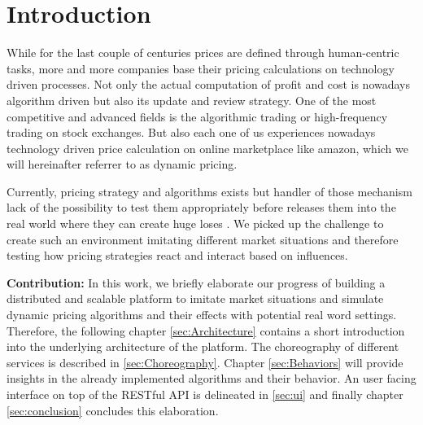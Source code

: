 \section{Introduction}
%
While for the last couple of centuries prices are defined through human-centric tasks, more and more companies base their pricing calculations on technology driven processes. Not only the actual computation of profit and cost is nowadays algorithm driven but also its update and review strategy.
One of the most competitive and advanced fields is the algorithmic trading or high-frequency trading on stock exchanges. But also each one of us experiences nowadays technology driven price calculation on online marketplace like amazon, which we will hereinafter referrer to as dynamic pricing. 

Currently, pricing strategy and algorithms exists but handler of those mechanism lack of the possibility to test them appropriately before releases them into the real world where they can create huge loses \citep{uflacker2016ertragsmanagement} \citep{schlosser2016optimal} \citep{schlosser2016stochastic} \citep{schlosser2016survive}. We picked up the challenge to create such an environment imitating different market situations and therefore testing how pricing strategies react and interact based on influences.

\textbf{Contribution:} In this work, we briefly elaborate our progress of building a distributed and scalable platform to imitate market situations and simulate dynamic pricing algorithms and their effects with potential real word settings.
Therefore, the following chapter \ref{sec:Architecture} contains a short introduction into the underlying architecture of the platform.
The choreography of different services is described in \ref{sec:Choreography}. Chapter \ref{sec:Behaviors} will provide insights in the already implemented algorithms and their behavior.
An user facing interface on top of the RESTful API is delineated in \ref{sec:ui} and finally chapter \ref{sec:conclusion} concludes this elaboration.